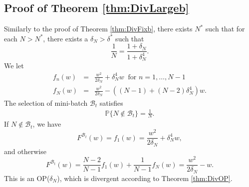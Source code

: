 \documentclass[twoside]{article}
\def\PP{\mathbb{P}}
\def\BB{\mathcal{B}}
\begin{document}
\subsection{Proof of Theorem \ref{thm:DivLargeb}}
Similarly to the proof of Theorem \ref{thm:DivFixb}, there exists $N^*$ such that for each $N>N^*$, there exists a $\delta_N>\delta^*$ such that 
\begin{equation*}
    \frac{1}{N} = \frac{1+\delta_{N}}{1+\delta_{N}^{4}}.
\end{equation*}
We let 
\begin{eqnarray}
f_n(w) &=& \frac{w^2}{2\delta_N} + \delta_N^4 w\;\;\text{for } n=1,\ldots, N-1\nonumber\\
f_N(w) &=& \frac{w^2}{2\delta_N} -((N-1) + (N-2)\delta_N^4) w.\nonumber
\end{eqnarray}
The selection of mini-batch $\BB_t$ satisfies
\begin{eqnarray}
\PP\{N\not \in \BB_t\} = \frac{1}{N}. \nonumber
\end{eqnarray}
If $N\not \in \BB_t$, we have
\begin{equation*}
    F^{\BB_t}(w) = f_1(w) = \frac{w^2}{2\delta_{N}} + \delta_N^4 w,
\end{equation*}
and otherwise
\begin{equation*}
    F^{\BB_t}(w) = \frac{N-2}{N-1}f_1(w)+\frac{1}{N-1}f_N(w) = \frac{w^2}{2\delta_N} - w.
\end{equation*}
This is an OP($\delta_N$), which is divergent according to Theorem \ref{thm:DivOP}.
\end{document}
